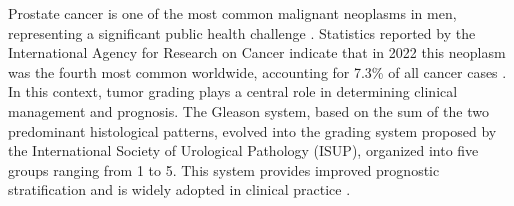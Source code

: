 Prostate cancer is one of the most common malignant neoplasms in men, representing a significant public health challenge \cite{ref_siegel2024}. Statistics reported by the International Agency for Research on Cancer indicate that in 2022 this neoplasm was the fourth most common worldwide, accounting for 7.3\% of all cancer cases \cite{JournalStatistic2024}. In this context, tumor grading plays a central role in determining clinical management and prognosis. The Gleason system, based on the sum of the two predominant histological patterns, evolved into the grading system proposed by the International Society of Urological Pathology (ISUP), organized into five groups ranging from 1 to 5. This system provides improved prognostic stratification and is widely adopted in clinical practice \cite{ref-epstein2016}.